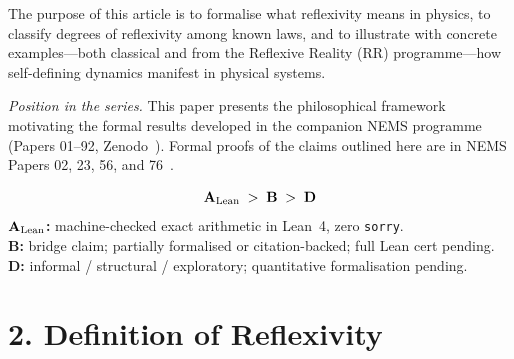 \documentclass[11pt]{article}
\newcommand{\CatAL}{\ensuremath{\textbf{A}_{\rm Lean}}}
\newcommand{\CatB}{\textbf{B}}
\newcommand{\CatD}{\textbf{D}}
\begin{document}
The purpose of this article is to formalise what reflexivity means in
physics, to classify degrees of reflexivity among known laws, and to
illustrate with concrete examples---both classical and from the
Reflexive Reality (RR) programme---how self-defining dynamics manifest
in physical systems.

\medskip
\noindent\textit{Position in the series.} This paper presents the
philosophical framework motivating the formal results developed in the
companion NEMS programme (Papers 01--92,
Zenodo~\cite{SpivackNEMSHub}).
Formal proofs of the claims outlined here are in NEMS Papers 02, 23,
56, and 76~\cite{SpivackNEMSTheorem,SpivackNEMS23,SpivackNEMS56,SpivackNEMS76}.

\begin{tcolorbox}[colback=gray!4,colframe=gray!50!black,
  title={\textbf{Claim-strength taxonomy}},
  fonttitle=\bfseries,left=6pt,right=6pt,top=5pt,bottom=5pt]
\small
\[
\CatAL \;>\; \CatB \;>\; \CatD
\]
\textbf{$\CatAL$:} machine-checked exact arithmetic in Lean~4, zero \texttt{sorry}.\\
\textbf{$\CatB$:} bridge claim; partially formalised or citation-backed; full Lean cert pending.\\
\textbf{$\CatD$:} informal / structural / exploratory; quantitative formalisation pending.
\end{tcolorbox}

\section*{2. Definition of Reflexivity}
\end{document}
